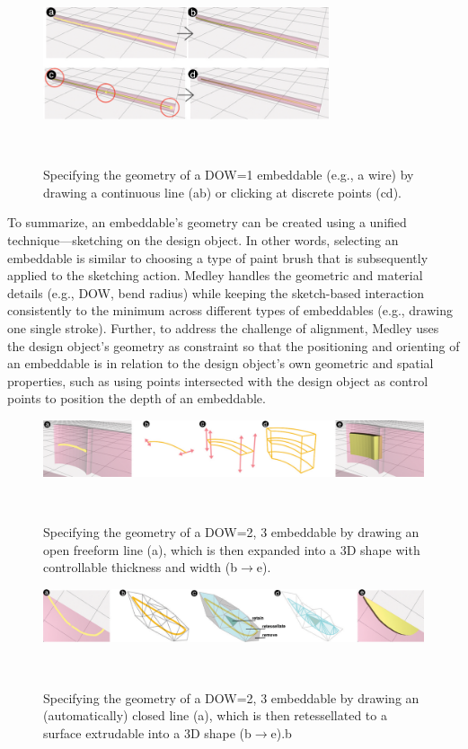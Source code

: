 \begin{figure} [t]
  \centering
  \includegraphics[width=0.75\textwidth]{figures/spec_dow1}
  \caption{Specifying the geometry of a DOW=1 embeddable (e.g., a wire) by drawing a continuous line (ab) or clicking at discrete points (cd).}~\label{fig:spec_dow1}
\end{figure}

To summarize, an embeddable's geometry can be created using a unified technique---sketching on the design object. In other words, selecting an embeddable is similar to choosing a type of paint brush that is subsequently applied to the sketching action. Medley handles the geometric and material details (e.g., DOW, bend radius) while keeping the sketch-based interaction consistently to the minimum across different types of embeddables (e.g., drawing one single stroke). Further, to address the challenge of alignment, Medley uses the design object's geometry as constraint so that the positioning and orienting of an embeddable is in relation to the design object's own geometric and spatial properties, such as using points intersected with the design object as control points to position the depth of an embeddable.



\begin{figure} [h]
  \centering
  \includegraphics[width=1\textwidth]{figures/spec_dow2a}
  \caption{Specifying the geometry of a DOW=2, 3 embeddable by drawing an open freeform line (a), which is then expanded into a 3D shape with controllable thickness and width (b$\rightarrow$e).}~\label{fig:spec_dow2a}
\end{figure}

\begin{figure} [h]
  \centering
  \includegraphics[width=1\textwidth]{figures/spec_dow2b}
  \caption{Specifying the geometry of a DOW=2, 3 embeddable by drawing an (automatically) closed line (a), which is then retessellated to a surface extrudable into a 3D shape (b$\rightarrow$e).b}~\label{fig:spec_dow2b}
\end{figure}

